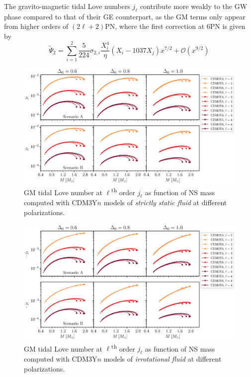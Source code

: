 The gravito-magnetic tidal Love numbers $j_\ell$ contribute more weakly to the \gls{GW} phase compared to that of their \gls{GE} counterpart, as the \gls{GM} terms only appear from higher orders of $(2\ell+2)$PN, where the first correction at 6PN is given by \citep{perot2021role,yagi2017erratum}
\begin{equation}
    \tilde{\Psi}_2 = \sum^{2}_{i=1} \frac{5}{224} \sigma_{2,i} \frac{X_i^4}{\eta} \left( X_i - 1037X_j \right)x^{7/2} + \mathcal{O}(x^{9/2})
\end{equation}
\begin{figure}[ht!]
        \centering
        \includegraphics[width=\textwidth]{fig/jl_stat.eps}
        \caption{\gls{GM} tidal Love number at $\ell$\textsuperscript{th} order $j_\ell$ as function of \gls{NS} mass computed with CDM3Y$n$ models of \emph{strictly static fluid} at different polarizations.}
        \label{fig:jl_stat}
\end{figure} 
\begin{figure}[ht!]
        \centering
        \includegraphics[width=\textwidth]{fig/jl_irrot.eps}
        \caption{\gls{GM} tidal Love number at $\ell$\textsuperscript{th} order $j_\ell$ as function of \gls{NS} mass computed with CDM3Y$n$ models of \emph{irrotational fluid} at different polarizations.}
        \label{fig:jl_irrot}
\end{figure} 

